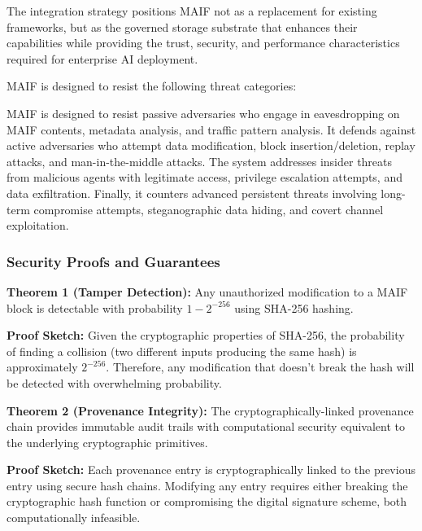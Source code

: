 \documentclass[conference]{IEEEtran}
\begin{document}
The integration strategy positions MAIF not as a replacement for existing frameworks, but as the governed storage substrate that enhances their capabilities while providing the trust, security, and performance characteristics required for enterprise AI deployment.

MAIF is designed to resist the following threat categories:

MAIF is designed to resist passive adversaries who engage in eavesdropping on MAIF contents, metadata analysis, and traffic pattern analysis. It defends against active adversaries who attempt data modification, block insertion/deletion, replay attacks, and man-in-the-middle attacks. The system addresses insider threats from malicious agents with legitimate access, privilege escalation attempts, and data exfiltration. Finally, it counters advanced persistent threats involving long-term compromise attempts, steganographic data hiding, and covert channel exploitation.

\subsubsection{Security Proofs and Guarantees}

\textbf{Theorem 1 (Tamper Detection):} Any unauthorized modification to a MAIF block is detectable with probability $1 - 2^{-256}$ using SHA-256 hashing.

\textbf{Proof Sketch:} Given the cryptographic properties of SHA-256, the probability of finding a collision (two different inputs producing the same hash) is approximately $2^{-256}$. Therefore, any modification that doesn't break the hash will be detected with overwhelming probability.

\textbf{Theorem 2 (Provenance Integrity):} The cryptographically-linked provenance chain provides immutable audit trails with computational security equivalent to the underlying cryptographic primitives.

\textbf{Proof Sketch:} Each provenance entry is cryptographically linked to the previous entry using secure hash chains. Modifying any entry requires either breaking the cryptographic hash function or compromising the digital signature scheme, both computationally infeasible.
\end{document}
